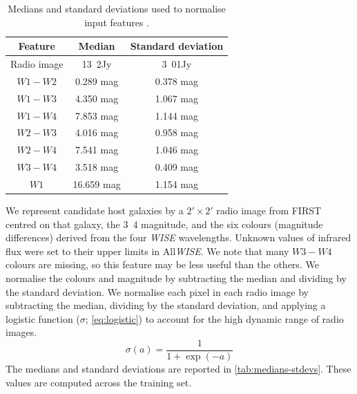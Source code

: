 \documentclass[11pt, a4paper]{book}
\providecommand{\DIFaddtex}[1]{{\protect\color{blue}\uwave{#1}}} %
\providecommand{\DIFaddFL}[1]{\DIFadd{#1}} %
\providecommand{\DIFaddbeginFL}{} %
\providecommand{\DIFaddendFL}{} %
\providecommand{\DIFadd}[1]{\texorpdfstring{\DIFaddtex{#1}}{#1}} %
\newcommand{\DIFaddincludegraphics}[2][]{{\color{blue}\fbox{\DIFOincludegraphics[#1]{#2}}}} %
\DeclareRobustCommand{\DIFaddbeginFL}{\DIFOaddbeginFL \let\includegraphics\DIFaddincludegraphics} %
\DeclareRobustCommand{\DIFaddendFL}{\DIFOaddendFL \let\includegraphics\DIFOincludegraphics} %
\begin{document}
\begin{table}
  \caption{Medians and standard deviations used to normalise input features \DIFaddbeginFL \DIFaddFL{for our classifiers}\DIFaddendFL .
    \label{tab:medians-stdevs}}
    \centering
  \begin{tabular}{ccc}
    \hline\hline
    Feature & Median & Standard deviation\\
    \hline
    Radio image & \unit{13.2}{\micro{}Jy} & \unit{3.01}{\milli{}Jy}\\
    $W1 - W2$ & 0.289 mag & 0.378 mag\\
    $W1 - W3$ & 4.350 mag & 1.067 mag\\
    $W1 - W4$ & 7.853 mag & 1.144 mag\\
    $W2 - W3$ & 4.016 mag & 0.958 mag\\
    $W2 - W4$ & 7.541 mag & 1.046 mag\\
    $W3 - W4$ & 3.518 mag & 0.409 mag\\
    $W1$ & 16.659 mag & 1.154 mag\\
    \hline\hline
  \end{tabular}
\end{table}

We represent candidate host galaxies by a $2' \times 2'$ radio image from FIRST centred on that galaxy, the \unit{3.4}{\micro\meter} magnitude, and the six colours (magnitude differences) derived from the four \emph{WISE} wavelengths. Unknown values of infrared flux were set to their upper limits in All\emph{WISE}. We note
that many $W3-W4$ colours are missing, so this feature may be less useful than
the others. We normalise the colours and magnitude by subtracting the median and
dividing by the standard deviation. We normalise each
pixel in each radio image by subtracting the median, dividing by the standard
deviation, and applying a logistic function ($\sigma$;
\autoref{eq:logistic}) to account for the high dynamic range of radio
images.
\begin{equation}
  \sigma(a) = \frac{1}{1 + \exp(-a)}
  \label{eq:logistic}
\end{equation}
The medians and standard deviations are reported in \autoref{tab:medians-stdevs}. These values are computed across the training set.
\end{document}

